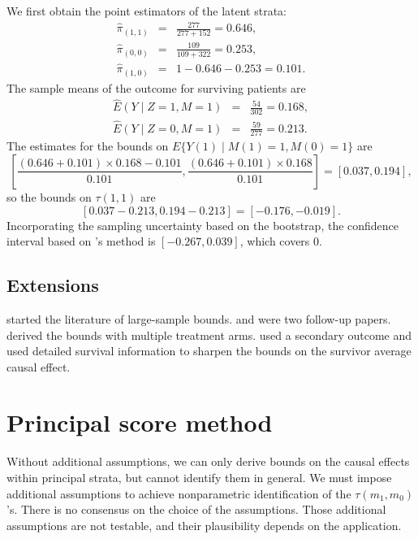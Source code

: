 We first obtain the point estimators of the latent strata:
\begin{eqnarray*} 
 \hat{\pi}_{(1,1)} &=& \frac{277}{277+152} = 0.646, \\
  \hat{\pi}_{(0,0)} &=&  \frac{109}{109+322} = 0.253,  \\ 
\hat{\pi}_{(1,0)} &=& 1 -0.646 -  0.253 =   0.101. 
\end{eqnarray*} 
The sample means of the outcome for surviving patients are
\begin{eqnarray*} 
\hat{E}(Y\mid Z=1,M=1) &=& \frac{54}{302} = 0.168, \\ 
\hat{E}(Y\mid Z=0, M=1) &=& \frac{59}{277} = 0.213.
\end{eqnarray*} 
The estimates for the bounds on $E\{  Y(1)\mid   M(1)=1, M(0)=1 \}$ are
$$
\left[ \frac{  ( 0.646 + 0.101 )\times  0.168-  0.101 }{  0.101 },  
\frac{ ( 0.646 + 0.101 )\times  0.168}{0.101} \right]
= [  0.037, 0.194],
$$
so the bounds on $\tau(1,1)$ are 
$$
[0.037- 0.213, 0.194- 0.213] = 
[  -0.176, -0.019 ] . 
$$
Incorporating the sampling uncertainty based on the bootstrap, the confidence interval based on \citet{imbens2004confidence}'s method is $[-0.267,  0.039]$, which covers 0.




\subsection{Extensions}


\citet{zhang2003estimation} started the literature of large-sample bounds. \citet{imai2008sharp} and \citet{lee2009training} were two follow-up papers. \citet{cheng2006bounds} derived the bounds with multiple treatment arms. \citet{yang2016using} used a secondary outcome and \citet{yang2018using} used detailed survival information to sharpen the bounds on the survivor average causal effect. 

 
 
 
\section{Principal score method} 
 
 
 
 
Without additional assumptions, we can only derive bounds on the causal effects within principal strata, but cannot identify them in general. We must impose additional assumptions to achieve nonparametric identification of the $\tau(m_1, m_0)$'s. There is no consensus on the choice of the assumptions. Those additional assumptions are not testable, and their plausibility depends on the application. 

